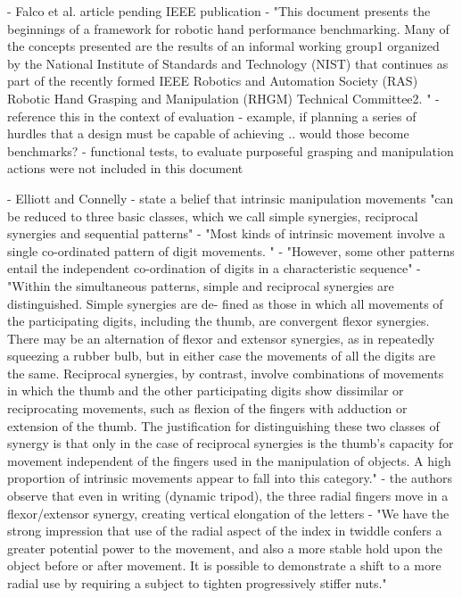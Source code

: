 	- Falco et al. article pending IEEE publication
		- "This document presents the beginnings of a framework for robotic hand performance benchmarking. Many of the concepts presented are the results of an informal working group1 organized by the National Institute of Standards and Technology (NIST) that continues as part of the recently formed IEEE Robotics and Automation Society (RAS) Robotic Hand Grasping and Manipulation (RHGM) Technical Committee2. "
		- reference this in the context of evaluation
			- example, if planning a series of hurdles that a design must be capable of achieving .. would those become benchmarks?
		- functional tests, to evaluate purposeful grasping and manipulation actions were not included in this document
		
	- Elliott and Connelly
		- state a belief that intrinsic manipulation movements "can be reduced to three basic classes, which we call simple synergies, reciprocal synergies and sequential patterns"
		- "Most kinds of intrinsic movement involve a single co-ordinated pattern of digit movements. "
		- "However, some other patterns entail the independent co-ordination of digits in a characteristic sequence"
		- "Within the simultaneous patterns, simple and reciprocal synergies are distinguished. Simple synergies are de- fined as those in which all movements of the participating digits, including the thumb, are convergent flexor synergies. There may be an alternation of flexor and extensor synergies, as in repeatedly squeezing a rubber bulb, but in either case the movements of all the digits are the same. Reciprocal synergies, by contrast, involve combinations of movements in which the thumb and the other participating digits show dissimilar or reciprocating movements, such as flexion of the fingers with adduction or extension of the thumb. The justification for distinguishing these two classes of synergy is that only in the case of reciprocal synergies is the thumb's capacity for movement independent of the fingers used in the manipulation of objects. A high proportion of intrinsic movements appear to fall into this category."
		- the authors observe that even in writing (dynamic tripod), the three radial fingers move in a flexor/extensor synergy, creating vertical elongation of the letters
		- "We have the strong impression that use of the radial aspect of the index in twiddle confers a greater potential power to the movement, and also a more stable hold upon the object before or after movement. It is possible to demonstrate a shift to a more radial use by requiring a subject to tighten progressively stiffer nuts."
		
